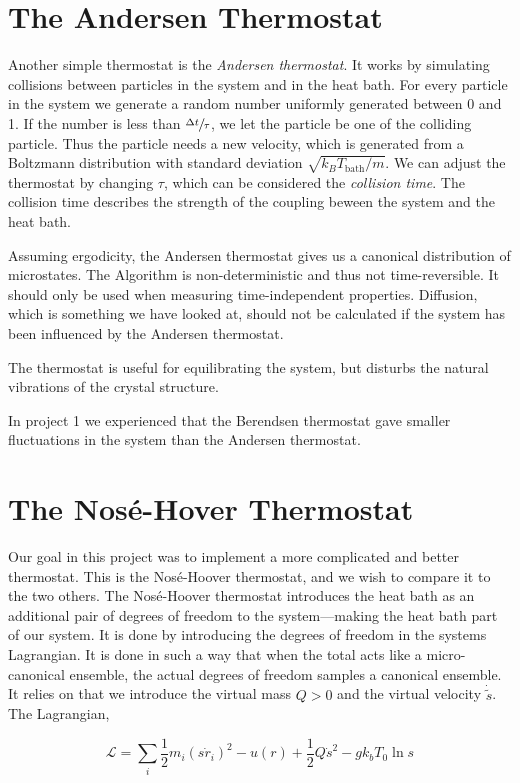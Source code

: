 \documentclass[12pt]{article}
\numberwithin{equation}{section}
\numberwithin{figure}{section}
\newcommand{\mc}[1]{\mathcal{#1}}
\newcommand{\ita}[1]{\textit{#1}}
\begin{document}
\section{The Andersen Thermostat}
Another simple thermostat is the \ita{Andersen thermostat}.
It works by simulating collisions between particles in the system
and in the heat bath.
For every particle in the system we generate a random number
uniformly generated between 0 and 1.
If the number is less than $\sfrac{\Delta t}{\tau}$,
we let the particle be one of the colliding particle. 
Thus the particle needs a new velocity, which is
generated from a Boltzmann distribution with standard deviation
$\sqrt{k_B T_{\text{bath}}/m}$.
We can adjust the thermostat by changing $\tau$, which can
be considered the \ita{collision time}.
The collision time describes the strength of the coupling beween
the system and the heat bath.

Assuming ergodicity, the Andersen thermostat gives us
a canonical distribution of microstates.
The Algorithm is non-deterministic and thus not time-reversible.
It should only be used when measuring time-independent properties.
Diffusion, which is something we have looked at, should not be
calculated if the system has been influenced by the Andersen thermostat.

The thermostat is useful for equilibrating the system,
but disturbs the natural vibrations of the crystal structure.

In project 1 we experienced that the Berendsen thermostat gave smaller
fluctuations in the system than the Andersen thermostat.



\section{The Nosé-Hover Thermostat}
Our goal in this project was to implement a more complicated and
better thermostat. This is the Nosé-Hoover thermostat,
and we wish to compare it to the two others.
The Nosé-Hoover thermostat introduces the heat bath as an additional pair
of degrees of freedom to the system---making the heat bath part of our
system. It is done by introducing the degrees of freedom in the
systems Lagrangian. It is done in such a way that when the total
acts like a micro-canonical ensemble, the actual degrees
of freedom samples a canonical ensemble. 
It relies on that we introduce the virtual mass $Q>0$
and the virtual velocity $\dot{\tilde s}$. The Lagrangian, 

\begin{equation}
    \mc L = \sum_i \frac{1}{2}m_i{(s\dot{r}_i)}^2 - u(r) 
    + \frac{1}{2}Q\dot{s}^2 - gk_b T_0 \ln s
\end{equation}
\end{document}
